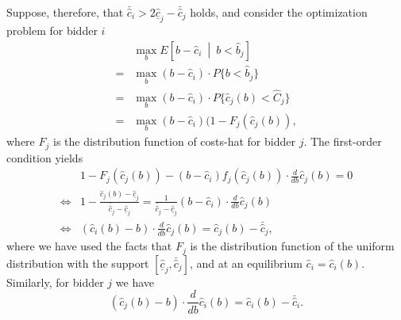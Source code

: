Suppose, therefore, that $\bar{\hat{c}}_i > 2\underline{\hat{c}}_j - \bar{\hat{c}}_j$ holds, and consider the optimization problem for bidder $i$
\begin{align*}
  &\max_{b} E \left[ b - \hat{c}_i \:\middle\vert\: b < \hat{b}_j \right]\\
  = &\max_{b} (b - \hat{c}_i)\cdot P\{b < \hat{b}_j\}\\
  = &\max_{b} (b - \hat{c}_i)\cdot P\{\hat{c}_j(b) < \hat{C}_j\}\\
  = &\max_{b} (b - \hat{c}_i)(1 - F_j(\hat{c}_j(b)),
\end{align*}
where $F_j$ is the distribution function of costs-hat for bidder $j$. The first-order condition yields
\begin{align}
  &1 - F_j(\hat{c}_j(b)) - (b - \hat{c}_i)f_j(\hat{c}_j(b))\cdot\frac{d}{db}\hat{c}_j(b) = 0 \nonumber \\
  \iff &1 - \frac{\hat{c}_j(b) - \underline{\hat{c}}_j}{\bar{\hat{c}}_j - \underline{\hat{c}}_j} = \frac{1}{\bar{\hat{c}}_j - \underline{\hat{c}}_j}(b - \hat{c}_i)\cdot\frac{d}{db}\hat{c}_j(b) \nonumber \\
  \iff &(\hat{c}_i(b) - b)\cdot\frac{d}{db}\hat{c}_j(b) = \hat{c}_j(b) - \bar{\hat{c}}_j,
  \label{eq:first_order_bidder_i}
\end{align}
where we have used the facts that $F_j$ is the distribution function of the uniform distribution with the support $[\underline{\hat{c}}_j, \bar{\hat{c}}_j]$, and at an equilibrium $\hat{c}_i = \hat{c}_i(b)$. Similarly, for bidder $j$ we have
\begin{equation}
  \label{eq:first_order_bidder_j}
  (\hat{c}_j(b) - b)\cdot\frac{d}{db}\hat{c}_i(b) = \hat{c}_i(b) - \bar{\hat{c}}_i.
\end{equation}

